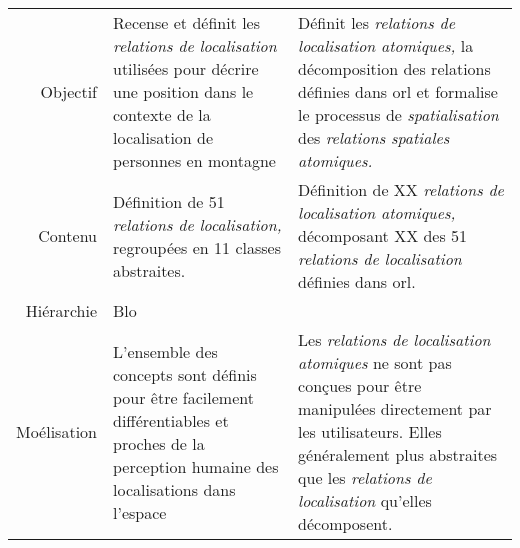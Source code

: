 \begin{tabular}{r>{\small}p{}>{\small}p{}}
  \toprule & \multicolumn{1}{c}{\ac{orl}} &
  \multicolumn{1}{c}{\ac{orla}} \\ \midrule
  \addlinespace
  Objectif & Recense et définit les \emph{relations de localisation} utilisées
  pour décrire une position dans le contexte de la localisation de
  personnes en montagne & Définit les \emph{relations de localisation
                          atomiques,} la décomposition des relations
  définies dans \ac{orl} et formalise le processus de
                          \emph{spatialisation} des \emph{relations
                          spatiales atomiques.}\\
  Contenu & Définition de 51 \emph{relations de localisation,}
            regroupées en 11 classes abstraites. & Définition de XX
                                                   \emph{relations de
                                                   localisation
                                                   atomiques,}
                                                   décomposant XX des
                                                   51 \emph{relations
                                                   de localisation}
                                                   définies dans \ac{orl}.\\
  Hiérarchie & Blo & \\
  Moélisation & L'ensemble des concepts sont définis pour être facilement
       différentiables et proches de la perception humaine des
       localisations dans l'espace & Les \emph{relations de
                                     localisation atomiques} ne sont
                                     pas conçues pour être manipulées
                                     directement par les utilisateurs.
  Elles généralement plus abstraites que les \emph{relations de
                                     localisation} qu'elles
                                     décomposent.\\ 
  \bottomrule
\end{tabular}
